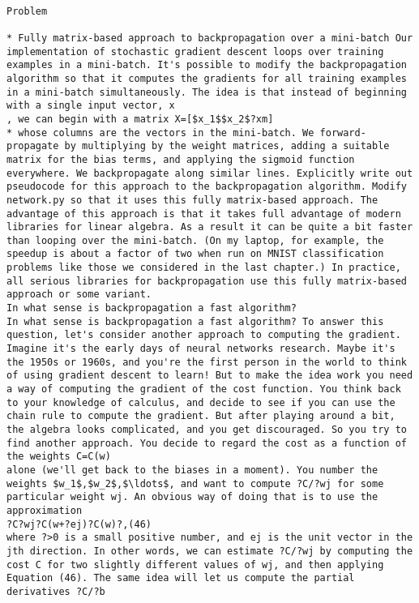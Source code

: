 \begin{lstlisting}

Problem

* Fully matrix-based approach to backpropagation over a mini-batch Our implementation of stochastic gradient descent loops over training examples in a mini-batch. It's possible to modify the backpropagation algorithm so that it computes the gradients for all training examples in a mini-batch simultaneously. The idea is that instead of beginning with a single input vector, x
, we can begin with a matrix X=[$x_1$$x_2$?xm]
* whose columns are the vectors in the mini-batch. We forward-propagate by multiplying by the weight matrices, adding a suitable matrix for the bias terms, and applying the sigmoid function everywhere. We backpropagate along similar lines. Explicitly write out pseudocode for this approach to the backpropagation algorithm. Modify network.py so that it uses this fully matrix-based approach. The advantage of this approach is that it takes full advantage of modern libraries for linear algebra. As a result it can be quite a bit faster than looping over the mini-batch. (On my laptop, for example, the speedup is about a factor of two when run on MNIST classification problems like those we considered in the last chapter.) In practice, all serious libraries for backpropagation use this fully matrix-based approach or some variant. 
In what sense is backpropagation a fast algorithm?
In what sense is backpropagation a fast algorithm? To answer this question, let's consider another approach to computing the gradient. Imagine it's the early days of neural networks research. Maybe it's the 1950s or 1960s, and you're the first person in the world to think of using gradient descent to learn! But to make the idea work you need a way of computing the gradient of the cost function. You think back to your knowledge of calculus, and decide to see if you can use the chain rule to compute the gradient. But after playing around a bit, the algebra looks complicated, and you get discouraged. So you try to find another approach. You decide to regard the cost as a function of the weights C=C(w)
alone (we'll get back to the biases in a moment). You number the weights $w_1$,$w_2$,$\ldots$, and want to compute ?C/?wj for some particular weight wj. An obvious way of doing that is to use the approximation 
?C?wj?C(w+?ej)?C(w)?,(46)
where ?>0 is a small positive number, and ej is the unit vector in the jth direction. In other words, we can estimate ?C/?wj by computing the cost C for two slightly different values of wj, and then applying Equation (46). The same idea will let us compute the partial derivatives ?C/?b

\end{lstlisting}
